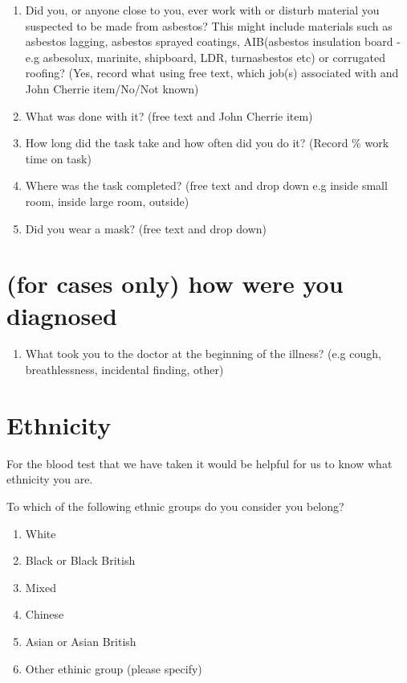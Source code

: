 \documentclass[a4paper,10pt]{article}
\begin{document}
\begin{enumerate}
\item Did you, or anyone close to you, ever work with or disturb material you suspected to be made from asbestos? This might include materials such as asbestos lagging, asbestos sprayed coatings, AIB(asbestos insulation board - e.g asbesolux, marinite, shipboard, LDR, turnasbestos etc) or corrugated roofing? (Yes, record what using free text, which job(s) associated with and John Cherrie item/No/Not known)
\item What was done with it? (free text and John Cherrie item)
\item How long did the task take and how often did you do it? (Record \% work time on task)
\item Where was the task completed? (free text and drop down e.g inside small room, inside large room, outside)
\item Did you wear a mask? (free text and drop down)
\end{enumerate}

\section{(for cases only) how were you diagnosed}

\begin{enumerate}
    \item What took you to the doctor at the beginning of the illness? (e.g cough, breathlessness, incidental finding, other) 
\end{enumerate}

\section{Ethnicity}
For the blood test that we have taken it would be helpful for us to know what ethnicity you are.

To which of the following ethnic groups do you consider you belong?

\begin{enumerate}
\item White
\item Black or Black British
\item Mixed
\item Chinese
\item Asian or Asian British
\item Other ethinic group (please specify)
\end{enumerate}
\end{document}
